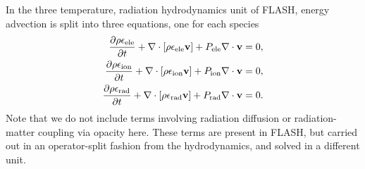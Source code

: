 \documentclass[preprint,11pt]{aastex}
\newcommand{\bea}{\begin{eqnarray}}
\newcommand{\eea}{\end{eqnarray}}
\begin{document}
{\color{red}In the three temperature, radiation hydrodynamics unit of FLASH, energy advection is split into three equations, one for each species
\bea 
\frac{\partial \rho \epsilon_{\rm ele}}{\partial t} + \nabla \cdot [\rho \epsilon_{\rm ele} \mathbf{v}] + P_{\rm ele} \nabla \cdot \mathbf{v} = 0, \\
\frac{\partial \rho \epsilon_{\rm ion}}{\partial t} + \nabla \cdot [\rho \epsilon_{\rm ion} \mathbf{v}] + P_{\rm ion} \nabla \cdot \mathbf{v} = 0, \\
\frac{\partial \rho \epsilon_{\rm rad}}{\partial t} + \nabla \cdot [\rho \epsilon_{\rm rad} \mathbf{v}] + P_{\rm rad} \nabla \cdot \mathbf{v} = 0.
\eea
Note that we do not include terms involving radiation diffusion or radiation-matter coupling via opacity here.  These terms are present in FLASH, but carried out in an operator-split fashion from the hydrodynamics, and solved in a different unit.

}
\end{document}
